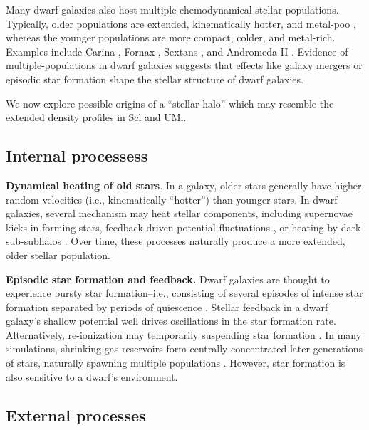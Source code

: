 Many dwarf galaxies also host multiple chemodynamical stellar
populations. Typically, older populations are extended, kinematically
hotter, and metal-poo , whereas the younger populations are more
compact, colder, and metal-rich. Examples include Carina
\citep[\citet{fabrizio+2016}, \citet{kordopatis+2016}]{battaglia+2012},
Fornax \citep[\citet{amorisco+evans2012},
\citet{delpino+aparicio+hidalgo2015}]{battaglia+2006}, Sextans
\citep{battaglia+2011, cicuendez+battaglia2018, roederer+2023}, and
Andromeda II
\citep{mcconnachie+arimoto+irwin2007, ho+2012, delpino+2017}. Evidence
of multiple-populations in dwarf galaxies suggests that effects like
galaxy mergers or episodic star formation shape the stellar structure of
dwarf galaxies.

We now explore possible origins of a ``stellar halo'' which may resemble
the extended density profiles in Scl and UMi.

\subsection{Internal processess}\label{internal-processess}

\textbf{Dynamical heating of old stars}. In a galaxy, older stars
generally have higher random velocities (i.e., kinematically ``hotter'')
than younger stars. In dwarf galaxies, several mechanism may heat
stellar components, including supernovae kicks in forming stars,
feedback-driven potential fluctuations
\citep{stinson+2009, maxwell+2012, el-badry+2016, mercado+2021}, or
heating by dark sub-subhalos \citep{penarrubia+2025}. Over time, these
processes naturally produce a more extended, older stellar population.

\textbf{Episodic star formation and feedback.} Dwarf galaxies are
thought to experience bursty star formation--i.e., consisting of several
episodes of intense star formation separated by periods of quiescence
\citep[e.g.,][]{salvadori+ferrara+schneider2008, valcke+derijcke+dejonghe2008, wheeler+2019, azartash-namin+2024}.
Stellar feedback in a dwarf galaxy's shallow potential well drives
oscillations in the star formation rate. Alternatively, re-ionization
may temporarily suspending star formation \citep{benitez-llambay+2015}.
In many simulations, shrinking gas reservoirs form
centrally-concentrated later generations of stars, naturally spawning
multiple populations \citep{kawata+2006, revaz+jablonka2018}. However,
star formation is also sensitive to a dwarf's environment.

\subsection{External processes}\label{external-processes}

